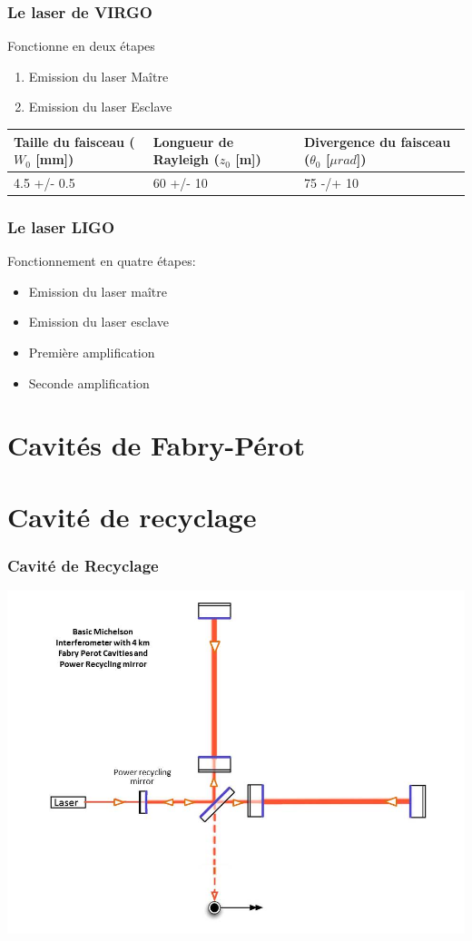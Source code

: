 \documentclass{beamer}
\begin{document}
\begin{frame}
	\frametitle{Le laser de VIRGO}
	Fonctionne en deux étapes
	\begin{enumerate}[1.]
		\item Emission du laser Maître
		\item Emission du laser Esclave 
	\end{enumerate}
	\begin{table}
	\small
	\centering
	\begin{tabular}{|l|l|l|}
	\hline
		\thead{Taille du faisceau \\ ($W_0$ [mm])}& \thead{Longueur de Rayleigh \\ ($z_0$ [m])} & \thead{Divergence du \\ faisceau ($\theta_0$ [$\mu rad$])} \\
		\hline
		4.5 +/- 0.5 & 60 +/- 10 & 75 -/+ 10 \\
		\hline
	\end{tabular}
	\end{table}

\end{frame}
\begin{frame}
\frametitle{Le laser LIGO}
Fonctionnement en quatre étapes:
\begin{itemize}
	\item Emission du laser maître
	\item Emission du laser esclave
	\item Première amplification
	\item Seconde amplification
\end{itemize}
\end{frame}

\section{Cavités de Fabry-Pérot}


\section{Cavité de recyclage}
\begin{frame}
	\frametitle{Cavité de Recyclage}
	\includegraphics[height=\textheight]{Docs/recycling_mirrors.png}
\end{frame}
\end{document}
